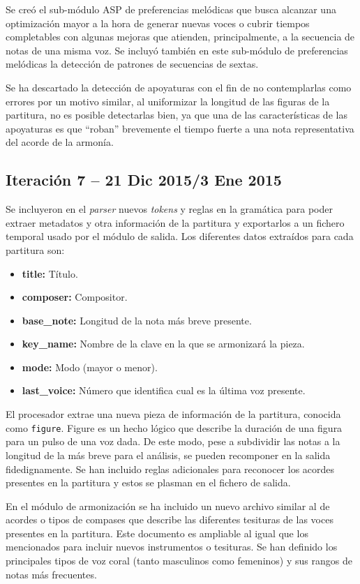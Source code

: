 Se creó el sub-módulo ASP de preferencias melódicas que busca alcanzar una optimización mayor a la hora de generar nuevas voces o cubrir tiempos completables con algunas mejoras que atienden, principalmente, a la secuencia de notas de una misma voz. Se incluyó también en este sub-módulo de preferencias melódicas la detección de patrones de secuencias de sextas.

Se ha descartado la detección de apoyaturas con el fin de no contemplarlas como errores por un motivo similar, al uniformizar la longitud de las figuras de la partitura, no es posible detectarlas bien, ya que una de las características de las apoyaturas es que ``roban'' brevemente el tiempo fuerte a una nota representativa del acorde de la armonía.

\subsection{Iteración 7 -- 21 Dic 2015/3 Ene 2015}
\label{subsec:seventh_iteration}

Se incluyeron en el \textit{parser} nuevos \textit{tokens} y reglas en la gramática para poder extraer metadatos y otra información de la partitura y exportarlos a un fichero temporal usado por el módulo de salida. Los diferentes datos extraídos para cada partitura son:
\begin{itemize}
	\item \textbf{title:} Título.
	\item \textbf{composer:} Compositor.
	\item \textbf{base\_note:} Longitud de la nota más breve presente.
	\item \textbf{key\_name:} Nombre de la clave en la que se armonizará la pieza.
	\item \textbf{mode:} Modo (mayor o menor).
	\item \textbf{last\_voice:} Número que identifica cual es la última voz presente.
\end{itemize}

El procesador extrae una nueva pieza de información de la partitura, conocida como \texttt{figure}. Figure es un hecho lógico que describe la duración de una figura para un pulso de una voz dada. De este modo, pese a subdividir las notas a la longitud de la más breve para el análisis, se pueden recomponer en la salida fidedignamente. Se han incluido reglas adicionales para reconocer los acordes presentes en la partitura y estos se plasman en el fichero de salida.

En el módulo de armonización se ha incluido un nuevo archivo similar al de acordes o tipos de compases que describe las diferentes tesituras de las voces presentes en la partitura. Este documento es ampliable al igual que los mencionados para incluir nuevos instrumentos o tesituras. Se han definido los principales tipos de voz coral (tanto masculinos como femeninos) y sus rangos de notas más frecuentes. 

